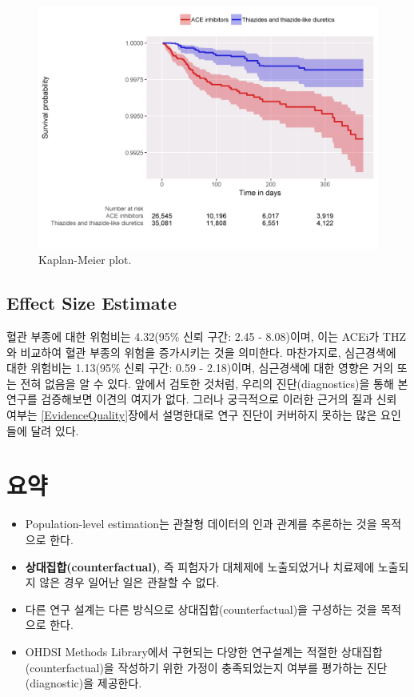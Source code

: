 \documentclass[11pt]{book}
\theoremstyle{definition}
\theoremstyle{definition}
\theoremstyle{definition}
\theoremstyle{remark}
\let\BeginKnitrBlock\begin \let\EndKnitrBlock\end
\begin{document}
\begin{figure}

{\centering \includegraphics[width=1\linewidth]{images/PopulationLevelEstimation/kmPlot} 

}

\caption{Kaplan-Meier plot.}\label{fig:kmPlot}
\end{figure}

\subsection{Effect Size Estimate}\label{effect-size-estimate}

혈관 부종에 대한 위험비는 4.32(95\% 신뢰 구간: 2.45 - 8.08)이며, 이는
ACEi가 THZ와 비교하여 혈관 부종의 위험을 증가시키는 것을 의미한다.
마찬가지로, 심근경색에 대한 위험비는 1.13(95\% 신뢰 구간: 0.59 -
2.18)이며, 심근경색에 대한 영향은 거의 또는 전혀 없음을 알 수 있다.
앞에서 검토한 것처럼, 우리의 진단(diagnostics)을 통해 본 연구를
검증해보면 이견의 여지가 없다. 그러나 궁극적으로 이러한 근거의 질과 신뢰
여부는 \ref{EvidenceQuality}장에서 설명한대로 연구 진단이 커버하지
못하는 많은 요인들에 달려 있다.

\section{요약}\label{-10}

\BeginKnitrBlock{rmdsummary}
\begin{itemize}
\item
  Population-level estimation는 관찰형 데이터의 인과 관계를 추론하는
  것을 목적으로 한다.
\item
  \textbf{상대집합(counterfactual)}, 즉 피험자가 대체제에 노출되었거나
  치료제에 노출되지 않은 경우 일어난 일은 관찰할 수 없다.
\item
  다른 연구 설계는 다른 방식으로 상대집합(counterfactual)을 구성하는
  것을 목적으로 한다.
\item
  OHDSI Methods Library에서 구현되는 다양한 연구설계는 적절한
  상대집합(counterfactual)을 작성하기 위한 가정이 충족되었는지 여부를
  평가하는 진단 (diagnostic)을 제공한다.
\end{itemize}
\EndKnitrBlock{rmdsummary}
\end{document}
